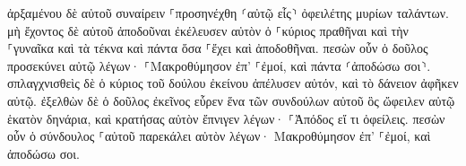 \documentclass{openreader}
\begin{document}
ἀρξαμένου δὲ αὐτοῦ συναίρειν ⸀προσηνέχθη ⸂αὐτῷ εἷς⸃ ὀφειλέτης μυρίων ταλάντων. 
μὴ ἔχοντος δὲ αὐτοῦ ἀποδοῦναι ἐκέλευσεν αὐτὸν ὁ ⸀κύριος πραθῆναι καὶ τὴν ⸀γυναῖκα καὶ τὰ τέκνα καὶ πάντα ὅσα ⸀ἔχει καὶ ἀποδοθῆναι. 
πεσὼν οὖν ὁ δοῦλος προσεκύνει αὐτῷ λέγων· ⸀Μακροθύμησον ἐπ’ ⸀ἐμοί, καὶ πάντα ⸂ἀποδώσω σοι⸃. 
σπλαγχνισθεὶς δὲ ὁ κύριος τοῦ δούλου ἐκείνου ἀπέλυσεν αὐτόν, καὶ τὸ δάνειον ἀφῆκεν αὐτῷ. 
ἐξελθὼν δὲ ὁ δοῦλος ἐκεῖνος εὗρεν ἕνα τῶν συνδούλων αὐτοῦ ὃς ὤφειλεν αὐτῷ ἑκατὸν δηνάρια, καὶ κρατήσας αὐτὸν ἔπνιγεν λέγων· ⸀Ἀπόδος εἴ τι ὀφείλεις. 
πεσὼν οὖν ὁ σύνδουλος ⸀αὐτοῦ παρεκάλει αὐτὸν λέγων· Μακροθύμησον ἐπ’ ⸀ἐμοί, καὶ ἀποδώσω σοι. 
\end{document}
